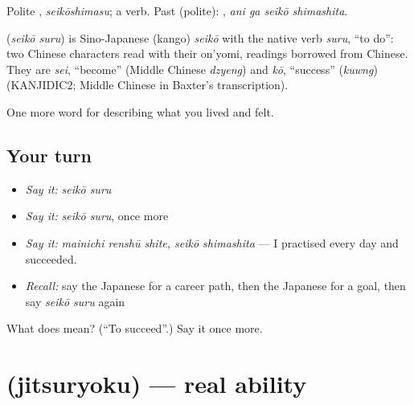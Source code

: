 Polite \textbf{}, \emph{seikōshimasu}; a  verb. Past (polite): \textbf{ }, \emph{ani ga seikō shimashita}.

\begin{cousinweb}
\textbf{} (\emph{seikō suru}) is Sino-Japanese (kango) \emph{seikō} with the native verb \emph{suru}, \textquotedblleft{}to do\textquotedblright{}: two Chinese characters read with their on'yomi, readings borrowed from Chinese. They are \emph{sei}, \textquotedblleft{}become\textquotedblright{} (Middle Chinese \emph{dzyeng}) and \emph{kō}, \textquotedblleft{}success\textquotedblright{} (\emph{kuwng}) (KANJIDIC2; Middle Chinese in Baxter's transcription).
\end{cousinweb}

\begin{grammarlens}[title={What you've built}]
One more word for describing what you lived and felt.
\end{grammarlens}

\subsection*{Your turn}
\begin{itemize}
\raggedright
  \item \emph{Say it:} \emph{seikō suru}
  \item \emph{Say it:} \emph{seikō suru}, once more
  \item \emph{Say it:} \emph{mainichi renshū shite, seikō shimashita} — I practised every day and succeeded.
  \item \emph{Recall:} say the Japanese for a career path, then the Japanese for a goal, then say \emph{seikō suru} again
\end{itemize}

\begin{tcolorbox}[breakable,colback=teal!4,colframe=teal!35!black,title={Before you move on}]
What does  mean? (\textquotedblleft{}To succeed\textquotedblright{}.) Say it once more.
\end{tcolorbox}
\section[\texorpdfstring{\ja{じつりょく} (jitsuryoku)}{じつりょく (jitsuryoku)}]{ (jitsuryoku) — real ability}

\label{lesson:JA-C460-jitsuryoku}



